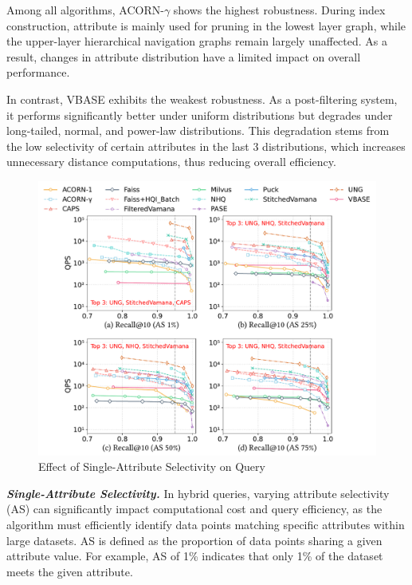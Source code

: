 \documentclass[sigconf, nonacm]{acmart}
\begin{document}
	Among all algorithms, ACORN-\(\gamma\) shows the highest robustness. During index construction, attribute is mainly used for pruning in the lowest layer graph, while the upper-layer hierarchical navigation graphs remain largely unaffected. As a result, changes in attribute distribution have a limited impact on overall performance.
	
	In contrast, VBASE exhibits the weakest robustness. As a post-filtering system, it performs significantly better under uniform distributions but degrades under long-tailed, normal, and power-law distributions. This degradation stems from the low selectivity of certain attributes in the last 3 distributions, which increases unnecessary distance computations, thus reducing overall efficiency.
	
	\begin{figure}
		\centering
		\setlength{\abovecaptionskip}{0.1cm}
		\setlength{\belowcaptionskip}{-0.1cm}
		\includegraphics[width=0.95\columnwidth]{figures/exp/exp_5_1_1_SingleLabel_1thread.pdf}
		\caption{Effect of Single-Attribute Selectivity on Query}
		\label{fig:exp_5_1_1_SingleLabel_1thread}
	\end{figure}
	
	
	\textit{\textbf{Single-Attribute Selectivity.}}
	In hybrid queries, varying attribute selectivity (AS) can significantly impact computational cost and query efficiency, as the algorithm must efficiently identify data points matching specific attributes within large datasets. AS is defined as the proportion of data points sharing a given attribute value. For example, AS of 1\% indicates that only 1\% of the dataset meets the given attribute. 
	
\end{document}
